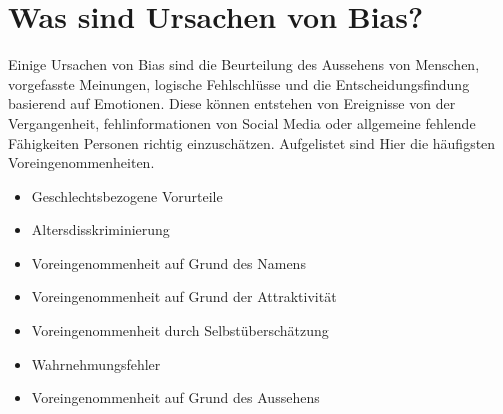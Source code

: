 
\section{Was sind Ursachen von Bias?}
Einige Ursachen von Bias sind die Beurteilung des Aussehens von Menschen, 
vorgefasste Meinungen, logische Fehlschlüsse und die Entscheidungsfindung basierend
auf Emotionen. Diese können entstehen von Ereignisse von der Vergangenheit, fehlinformationen
von Social Media oder allgemeine fehlende Fähigkeiten Personen richtig einzuschätzen.
Aufgelistet sind Hier die häufigsten Voreingenommenheiten.
\begin{itemize}
    \item Geschlechtsbezogene Vorurteile
    \item Altersdisskriminierung
    \item Voreingenommenheit auf Grund des Namens
    \item Voreingenommenheit auf Grund der Attraktivität
    \item Voreingenommenheit durch Selbstüberschätzung
    \item Wahrnehmungsfehler
    \item Voreingenommenheit auf Grund des Aussehens
\end{itemize} \citep{Ursachen_Bias}